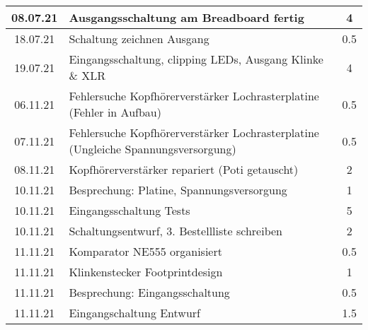 \begin{longtable}{c|p{10cm}|c}
    08.07.21       & Ausgangsschaltung am Breadboard fertig                                                                        & 4                \\ \hline
    18.07.21       & Schaltung zeichnen Ausgang                                                                                    & 0.5              \\ \hline
    19.07.21       & Eingangsschaltung, clipping LEDs, \newline Ausgang Klinke \& XLR                                              & 4                \\ \hline
    06.11.21       & Fehlersuche Kopfhörerverstärker \newline Lochrasterplatine (Fehler in   Aufbau)                               & 0.5              \\ \hline
    07.11.21       & Fehlersuche Kopfhörerverstärker \newline Lochrasterplatine (Ungleiche   Spannungsversorgung)                  & 0.5              \\ \hline
    08.11.21       & Kopfhörerverstärker repariert (Poti getauscht)                                                                & 2                \\ \hline
    10.11.21       & Besprechung: Platine, Spannungsversorgung                                                                     & 1                \\ \hline
    10.11.21       & Eingangsschaltung Tests                                                                                       & 5                \\ \hline
    10.11.21       & Schaltungsentwurf, 3. Bestellliste schreiben                                                                  & 2                \\ \hline
    11.11.21       & Komparator NE555 organisiert                                                                                  & 0.5              \\ \hline
    11.11.21       & Klinkenstecker Footprintdesign                                                                                & 1                \\ \hline
    11.11.21       & Besprechung: Eingangsschaltung                                                                                & 0.5              \\ \hline
    11.11.21       & Eingangschaltung Entwurf                                                                                      & 1.5              \\ \hline

\end{longtable}
